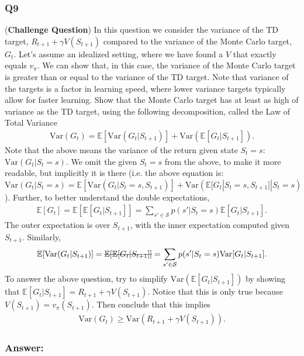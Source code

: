 \documentclass[a4paper, 10pt]{article}
\begin{document}
\subsubsection*{Q9}
(\textbf{Challenge Question})
In this question we consider the variance of the TD target, $R_{t+1} + \gamma V(S_{t+1})$ compared to the variance of the Monte Carlo target, $G_t$. Let's assume an idealized setting, where we have found a $V$ that exactly equals $v_\pi$. We can show that, in this case, the variance of the Monte Carlo target is greater than or equal to the variance of the TD target. Note that variance of the targets is a factor in learning speed, where lower variance targets typically allow for faster learning. Show that  the Monte Carlo target has at least as high of variance as the TD target, using the following decomposition, called the Law of Total Variance
%
\begin{align*}
\text{Var}(G_t) = \mathbb{E}[\text{Var}(G_t | S_{t+1})] + \text{Var}(\mathbb{E}[G_t | S_{t+1}])  
.
\end{align*} 
%
Note that the above means the variance of the return given state $S_t = s$: $\text{Var}(G_t | S_t = s)$. We omit the given $S_t = s$ from the above, to make it more readable, but implicitly it is there (i.e. the above equation is: $\text{Var}(G_t | S_t = s) = \mathbb{E}[\text{Var}(G_t | S_t = s, S_{t+1})] + \text{Var}(\mathbb{E}[G_t | S_t = s, S_{t+1}] | S_t = s)  $). Further, to better understand the double expectations, 
%
\begin{align*}
\mathbb{E}[G_t] = \mathbb{E}[\mathbb{E}[G_t | S_{t+1}]] = \sum _{s' \in \mathcal{S}} p(s' | S_t = s) \mathbb{E}[G_t | S_{t+1}]
.
\end{align*} 
%
The outer expectation is over $S_{t+1}$, with the inner expectation computed given $S_{t+1}$. Similarly, 
%
\begin{align*}
\mathbb{E}[\text{Var}(G_t | S_{t+1})]  = \text{\sout{$\mathbb{E}[\mathbb{E}[G_t | S_{t+1}]]$}} = \sum _{s' \in \mathcal{S}} p(s' | S_t = s) \text{Var}[G_t | S_{t+1}]
.
\end{align*} 
% 
To answer the above question, try to simplify $\text{Var}(\mathbb{E}[G_t | S_{t+1}])$ by showing that $\mathbb{E}[G_t | S_{t+1}] = R_{t+1} + \gamma V(S_{t+1})$. Notice that this is only true because $V(S_{t+1}) = v_\pi(S_{t+1})$.
Then conclude that this implies  
%
\begin{align*}
\text{Var}(G_t) \ge \text{Var}(R_{t+1} + \gamma V(S_{t+1}))  
.
\end{align*} 
%

\subsubsection*{Answer:}
\end{document}
